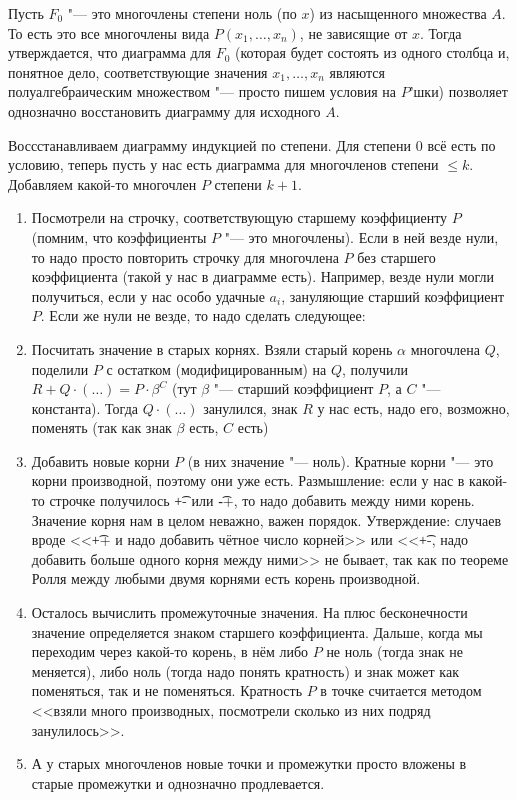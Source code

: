 	Пусть $F_0$ "--- это многочлены степени ноль (по $x$) из насыщенного множества $A$.
	То есть это все многочлены вида $P(x_1, \dots, x_n)$, не зависящие от $x$.
	Тогда утверждается, что диаграмма для $F_0$ (которая будет состоять из одного столбца и, понятное дело,
	соответствующие значения $x_1, \dots, x_n$ являются полуалгебраическим множеством "--- просто пишем условия на $P$'шки)
	позволяет однозначно восстановить диаграмму для исходного $A$.

	Воссстанавливаем диаграмму индукцией по степени.
	Для степени $0$ всё есть по условию, теперь пусть у нас есть диаграмма для многочленов степени $\le k$.
	Добавляем какой-то многочлен $P$ степени $k+1$.
	\begin{enumerate}
	\item
		Посмотрели на строчку, соответствующую старшему коэффициенту $P$ (помним, что коэффициенты $P$ "--- это многочлены).
		Если в ней везде нули, то надо просто повторить строчку для многочлена $P$ без старшего коэффициента (такой у нас в диаграмме есть).
		Например, везде нули могли получиться, если у нас особо удачные $a_i$, зануляющие старший коэффициент $P$.
		Если же нули не везде, то надо сделать следующее:
	\item
		Посчитать значение в старых корнях.
		Взяли старый корень $\alpha$ многочлена $Q$, поделили $P$ с остатком (модифицированным) на $Q$,
		получили $R+Q\cdot (\dots)=P\cdot \beta^C$ (тут $\beta$ "--- старший коэффициент $P$, а $C$ "--- константа).
		Тогда $Q\cdot (\dots)$ занулился, знак $R$ у нас есть, надо его, возможно, поменять (так как знак $\beta$ есть, $C$ есть)
	\item
		Добавить новые корни $P$ (в них значение "--- ноль).
		Кратные корни "--- это корни производной, поэтому они уже есть.
		Размышление: если у нас в какой-то строчке получилось \t{+-} или \t{-+}, то надо добавить между ними корень.
		Значение корня нам в целом неважно, важен порядок.
		Утверждение: случаев вроде <<\t{++} и надо добавить чётное число корней>> или <<\t{+-}, надо добавить больше одного корня между ними>> не бывает,
		так как по теореме Ролля между любыми двумя корнями есть корень производной.
	\item
		Осталось вычислить промежуточные значения.
		На плюс бесконечности значение определяется знаком старшего коэффициента.
		Дальше, когда мы переходим через какой-то корень, в нём либо $P$ не ноль (тогда знак не меняется),
		либо ноль (тогда надо понять кратность) и знак может как поменяться, так и не поменяться.
		Кратность $P$ в точке считается методом <<взяли много производных, посмотрели сколько из них подряд занулилось>>.
	\item
		А у старых многочленов новые точки и промежутки просто вложены в старые промежутки и однозначно продлевается.
	\end{enumerate}
